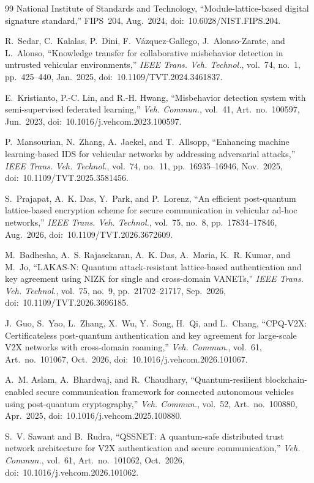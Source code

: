 \documentclass[journal,twoside]{IEEEtran}
\begin{document}
\begin{thebibliography}{99}
National Institute of Standards and Technology, ``Module-lattice-based digital signature standard,'' FIPS~204, Aug.~2024, doi:~10.6028/NIST.FIPS.204.

R.~Sedar, C.~Kalalas, P.~Dini, F.~V{\'a}zquez-Gallego, J.~Alonso-Zarate, and L.~Alonso, ``Knowledge transfer for collaborative misbehavior detection in untrusted vehicular environments,'' \emph{IEEE Trans. Veh. Technol.}, vol.~74, no.~1, pp.~425--440, Jan.~2025, doi:~10.1109/TVT.2024.3461837.

E.~Kristianto, P.-C. Lin, and R.-H. Hwang, ``Misbehavior detection system with semi-supervised federated learning,'' \emph{Veh. Commun.}, vol.~41, Art.~no.~100597, Jun.~2023, doi:~10.1016/j.vehcom.2023.100597.

P.~Mansourian, N.~Zhang, A.~Jaekel, and T.~Allsopp, ``Enhancing machine learning-based {IDS} for vehicular networks by addressing adversarial attacks,'' \emph{IEEE Trans. Veh. Technol.}, vol.~74, no.~11, pp.~16935--16946, Nov.~2025, doi:~10.1109/TVT.2025.3581456.

S.~Prajapat, A.~K. Das, Y.~Park, and P.~Lorenz, ``An efficient post-quantum lattice-based encryption scheme for secure communication in vehicular ad-hoc networks,'' \emph{IEEE Trans. Veh. Technol.}, vol.~75, no.~8, pp.~17834--17846, Aug.~2026, doi:~10.1109/TVT.2026.3672609.

M.~Badhesha, A.~S. Rajasekaran, A.~K. Das, A.~Maria, K.~R. Kumar, and M.~Jo, ``{LAKAS-N}: Quantum attack-resistant lattice-based authentication and key agreement using {NIZK} for single and cross-domain {VANETs},'' \emph{IEEE Trans. Veh. Technol.}, vol.~75, no.~9, pp.~21702--21717, Sep.~2026, doi:~10.1109/TVT.2026.3696185.

J.~Guo, S.~Yao, L.~Zhang, X.~Wu, Y.~Song, H.~Qi, and L.~Chang, ``{CPQ-V2X}: Certificateless post-quantum authentication and key agreement for large-scale {V2X} networks with cross-domain roaming,'' \emph{Veh. Commun.}, vol.~61, Art.~no.~101067, Oct.~2026, doi:~10.1016/j.vehcom.2026.101067.

A.~M. Aslam, A.~Bhardwaj, and R.~Chaudhary, ``Quantum-resilient blockchain-enabled secure communication framework for connected autonomous vehicles using post-quantum cryptography,'' \emph{Veh. Commun.}, vol.~52, Art.~no.~100880, Apr.~2025, doi:~10.1016/j.vehcom.2025.100880.

S.~V. Sawant and B.~Rudra, ``{QSSNET}: A quantum-safe distributed trust network architecture for {V2X} authentication and secure communication,'' \emph{Veh. Commun.}, vol.~61, Art.~no.~101062, Oct.~2026, doi:~10.1016/j.vehcom.2026.101062.


\end{thebibliography}
\end{document}
